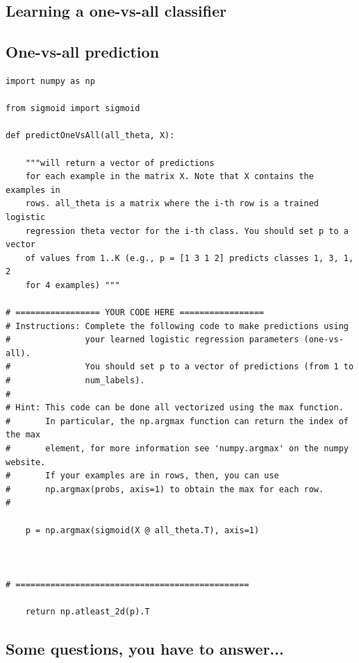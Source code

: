 \subsection{ Learning a one-vs-all classifier}

\subsection{One-vs-all prediction}


\begin{lstlisting}
import numpy as np

from sigmoid import sigmoid

def predictOneVsAll(all_theta, X):
    
    """will return a vector of predictions
    for each example in the matrix X. Note that X contains the examples in
    rows. all_theta is a matrix where the i-th row is a trained logistic
    regression theta vector for the i-th class. You should set p to a vector
    of values from 1..K (e.g., p = [1 3 1 2] predicts classes 1, 3, 1, 2
    for 4 examples) """

# ================= YOUR CODE HERE =================
# Instructions: Complete the following code to make predictions using
#               your learned logistic regression parameters (one-vs-all).
#               You should set p to a vector of predictions (from 1 to
#               num_labels).
#
# Hint: This code can be done all vectorized using the max function.
#       In particular, the np.argmax function can return the index of the max 
#       element, for more information see 'numpy.argmax' on the numpy website. 
#       If your examples are in rows, then, you can use 
#       np.argmax(probs, axis=1) to obtain the max for each row.
#       

    p = np.argmax(sigmoid(X @ all_theta.T), axis=1) 



# ===============================================

    return np.atleast_2d(p).T 
\end{lstlisting}

\subsection{Some questions, you have to answer...}

